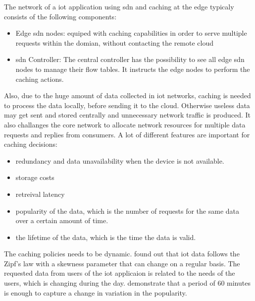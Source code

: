 \documentclass[conference]{IEEEtran}
\begin{document}
	The network of a \ac{iot} application using \ac{sdn} and caching at the edge typicaly consists of the following components:
	\begin{itemize}
		\item Edge \ac{sdn} nodes: equiped with caching capabilities in order to serve multiple requests within the domian, without contacting the remote cloud
		\item \ac{sdn} Controller: The central controller has the possibility to see all edge \ac{sdn} nodes to manage their flow tables. It instructs the edge nodes to perform the caching actions. \cite{caching-2}  
	\end{itemize}

	Also, due to the huge amount of data collected in \ac{iot} networks, caching is needed to process the data locally, before sending it to the cloud. Otherwise useless data may get sent and stored centrally and unnecessary network traffic is produced. \cite{caching-1} It also challanges the core network to allocate network resources for multiple data requests and replies from consumers. \cite{caching-2}
	A lot of different features are important for caching decisions:

	\begin{itemize}
		\item redundancy and data unavailability when the device is not available. \cite{caching-1}
		\item storage costs
		\item retreival latency
		\item popularity of the data, which is the number of requests for the same data over a certain amount of time. \cite{caching-2}
		\item the lifetime of the data, which is the time the data is valid. \cite{caching-2}
	\end{itemize}

	The caching policies needs to be dynamic. \cite{caching-5} found out that \ac{iot} data follows the Zipf's law with a skewness parameter that can change on a regular basis. The requested data from users of the \ac{iot} applicaion is related to the needs of the users, which is changing during the day. \citeauthor{caching-5} demonstrate that a period of 60 minutes is enough to capture a change in variation in the popularity.  
\end{document}
